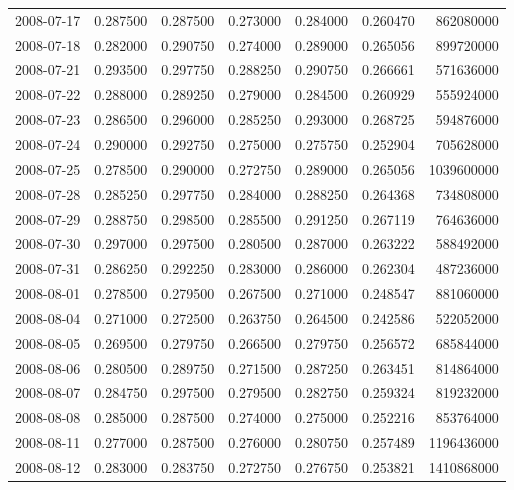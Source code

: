 \begin{tabular}{lrrrrrr}
2008-07-17 &    0.287500 &    0.287500 &    0.273000 &    0.284000 &    0.260470 &   862080000 \\
2008-07-18 &    0.282000 &    0.290750 &    0.274000 &    0.289000 &    0.265056 &   899720000 \\
2008-07-21 &    0.293500 &    0.297750 &    0.288250 &    0.290750 &    0.266661 &   571636000 \\
2008-07-22 &    0.288000 &    0.289250 &    0.279000 &    0.284500 &    0.260929 &   555924000 \\
2008-07-23 &    0.286500 &    0.296000 &    0.285250 &    0.293000 &    0.268725 &   594876000 \\
2008-07-24 &    0.290000 &    0.292750 &    0.275000 &    0.275750 &    0.252904 &   705628000 \\
2008-07-25 &    0.278500 &    0.290000 &    0.272750 &    0.289000 &    0.265056 &  1039600000 \\
2008-07-28 &    0.285250 &    0.297750 &    0.284000 &    0.288250 &    0.264368 &   734808000 \\
2008-07-29 &    0.288750 &    0.298500 &    0.285500 &    0.291250 &    0.267119 &   764636000 \\
2008-07-30 &    0.297000 &    0.297500 &    0.280500 &    0.287000 &    0.263222 &   588492000 \\
2008-07-31 &    0.286250 &    0.292250 &    0.283000 &    0.286000 &    0.262304 &   487236000 \\
2008-08-01 &    0.278500 &    0.279500 &    0.267500 &    0.271000 &    0.248547 &   881060000 \\
2008-08-04 &    0.271000 &    0.272500 &    0.263750 &    0.264500 &    0.242586 &   522052000 \\
2008-08-05 &    0.269500 &    0.279750 &    0.266500 &    0.279750 &    0.256572 &   685844000 \\
2008-08-06 &    0.280500 &    0.289750 &    0.271500 &    0.287250 &    0.263451 &   814864000 \\
2008-08-07 &    0.284750 &    0.297500 &    0.279500 &    0.282750 &    0.259324 &   819232000 \\
2008-08-08 &    0.285000 &    0.287500 &    0.274000 &    0.275000 &    0.252216 &   853764000 \\
2008-08-11 &    0.277000 &    0.287500 &    0.276000 &    0.280750 &    0.257489 &  1196436000 \\
2008-08-12 &    0.283000 &    0.283750 &    0.272750 &    0.276750 &    0.253821 &  1410868000 \\

\end{tabular}
